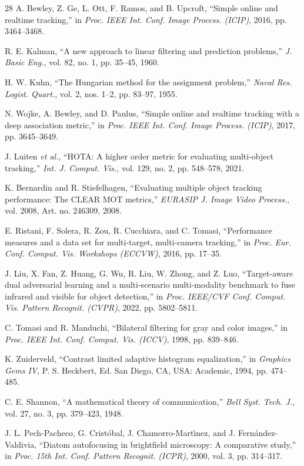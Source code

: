 \documentclass[journal]{IEEEtran}
\begin{document}
\begin{thebibliography}{28}
A. Bewley, Z. Ge, L. Ott, F. Ramos, and B. Upcroft, ``Simple online and realtime tracking,'' in \emph{Proc. IEEE Int. Conf. Image Process. (ICIP)}, 2016, pp. 3464--3468.

R. E. Kalman, ``A new approach to linear filtering and prediction problems,'' \emph{J. Basic Eng.}, vol. 82, no. 1, pp. 35--45, 1960.

H. W. Kuhn, ``The Hungarian method for the assignment problem,'' \emph{Naval Res. Logist. Quart.}, vol. 2, nos. 1--2, pp. 83--97, 1955.

N. Wojke, A. Bewley, and D. Paulus, ``Simple online and realtime tracking with a deep association metric,'' in \emph{Proc. IEEE Int. Conf. Image Process. (ICIP)}, 2017, pp. 3645--3649.

J. Luiten \emph{et al.}, ``HOTA: A higher order metric for evaluating multi-object tracking,'' \emph{Int. J. Comput. Vis.}, vol. 129, no. 2, pp. 548--578, 2021.

K. Bernardin and R. Stiefelhagen, ``Evaluating multiple object tracking performance: The CLEAR MOT metrics,'' \emph{EURASIP J. Image Video Process.}, vol. 2008, Art. no. 246309, 2008.

E. Ristani, F. Solera, R. Zou, R. Cucchiara, and C. Tomasi, ``Performance measures and a data set for multi-target, multi-camera tracking,'' in \emph{Proc. Eur. Conf. Comput. Vis. Workshops (ECCVW)}, 2016, pp. 17--35.

J. Liu, X. Fan, Z. Huang, G. Wu, R. Liu, W. Zhong, and Z. Luo, ``Target-aware dual adversarial learning and a multi-scenario multi-modality benchmark to fuse infrared and visible for object detection,'' in \emph{Proc. IEEE/CVF Conf. Comput. Vis. Pattern Recognit. (CVPR)}, 2022, pp. 5802--5811.

C. Tomasi and R. Manduchi, ``Bilateral filtering for gray and color images,'' in \emph{Proc. IEEE Int. Conf. Comput. Vis. (ICCV)}, 1998, pp. 839--846.

K. Zuiderveld, ``Contrast limited adaptive histogram equalization,'' in \emph{Graphics Gems IV}, P. S. Heckbert, Ed. San Diego, CA, USA: Academic, 1994, pp. 474--485.

C. E. Shannon, ``A mathematical theory of communication,'' \emph{Bell Syst. Tech. J.}, vol. 27, no. 3, pp. 379--423, 1948.

J. L. Pech-Pacheco, G. Crist{\'o}bal, J. Chamorro-Mart{\'\i}nez, and J. Fern{\'a}ndez-Valdivia, ``Diatom autofocusing in brightfield microscopy: A comparative study,'' in \emph{Proc. 15th Int. Conf. Pattern Recognit. (ICPR)}, 2000, vol. 3, pp. 314--317.


\end{thebibliography}
\end{document}
